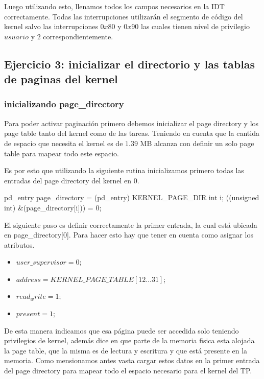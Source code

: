 \documentclass[a4paper,10pt,twoside]{article}
\newenvironment{pseudocodigo}
    {\vspace{0.5em} \begin{algorithmic}}
    {\end{algorithmic} \vspace{0.5em}}
\begin{document}
Luego utilizando esto, llenamos todos los campos necesarios en la IDT correctamente. Todas las interrupciones utilizarán el segmento de código del kernel salvo las interrupciones $0x80$ y $0x90$ las cuales tienen nivel de privilegio $usuario$ y $2$ correspondientemente.


\subsection{Ejercicio 3: inicializar el directorio y las tablas de paginas del kernel}
\subsubsection{inicializando page\_directory}
Para poder activar paginación primero debemos inicializar el page directory y los page table tanto del kernel como de las tareas. Teniendo en cuenta que la cantida de espacio que necesita el kernel es de $1.39$ MB alcanza con definir un solo page table para mapear todo este espacio.

Es por esto que utilizando la siguiente rutina inicializamos primero todas las entradas del page directory del kernel en $0$.

\begin{pseudocodigo}
  \STATE pd\_entry\* page\_directory = (pd\_entry\*) KERNEL\_PAGE\_DIR
  \STATE int i;
    \STATE \*((unsigned int\*) \&(page\_directory[i])) = 0;
  \ENDFOR
\end{pseudocodigo}

El siguiente paso es definir correctamente la primer entrada, la cual está ubicada en page\_directory[0]. Para hacer esto hay que tener en cuenta como asignar los atributos. 

\begin{itemize}
 \item $user\_supervisor = 0$;
 \item $address = KERNEL\_PAGE\_TABLE[12 \ldots 31]$;
 \item $read_write = 1$;
 \item $present = 1$;
\end{itemize}

De esta manera indicamos que esa página puede ser accedida solo teniendo privilegios de kernel, además dice en que parte de la memoria fisica esta alojada la page table, que la misma es de lectura y escritura y que está presente en la memoria.
Como mensionamos antes vasta cargar estos datos en la primer entrada del page directory para mapear todo el espacio necesario para el kernel del TP.
\end{document}
